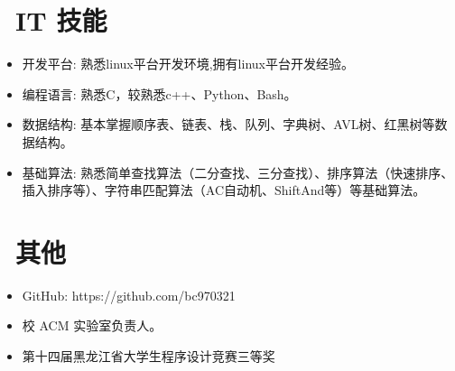 \documentclass{resume}
\begin{document}

\section{\faCogs\ IT 技能}
\begin{itemize}[parsep=0.5ex]
	\item 开发平台: 熟悉linux平台开发环境,拥有linux平台开发经验。
	\item 编程语言: 熟悉C，较熟悉c++、Python、Bash。
	\item 数据结构: 基本掌握顺序表、链表、栈、队列、字典树、AVL树、红黑树等数据结构。
	\item 基础算法: 熟悉简单查找算法（二分查找、三分查找）、排序算法（快速排序、插入排序等）、字符串匹配算法（AC自动机、ShiftAnd等）等基础算法。
\end{itemize}

\section{\faInfo\ 其他}
\begin{itemize}[parsep=0.5ex]
  \item GitHub:  https://github.com/bc970321
  \item 校 ACM 实验室负责人。
  \item 第十四届黑龙江省大学生程序设计竞赛三等奖
\end{itemize}

%
%
\end{document}
